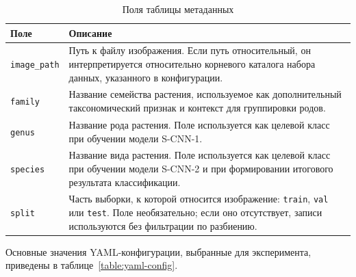 \begin{table}[!htbp]
	\centering
	\caption{Поля таблицы метаданных}
	\label{table:metadata-fields}
	\footnotesize
	\renewcommand{\arraystretch}{1.2}
	\begin{tabularx}{\linewidth}{|p{4.2cm}|X|}
		\hline
		\textbf{Поле} & \textbf{Описание} \\
		\hline
		\texttt{image\_path} & Путь к файлу изображения. Если путь относительный, он интерпретируется относительно корневого каталога набора данных, указанного в конфигурации. \\
		\hline
		\texttt{family} & Название семейства растения, используемое как дополнительный таксономический признак и контекст для группировки родов. \\
		\hline
		\texttt{genus} & Название рода растения. Поле используется как целевой класс при обучении модели S-CNN-1. \\
		\hline
		\texttt{species} & Название вида растения. Поле используется как целевой класс при обучении модели S-CNN-2 и при формировании итогового результата классификации. \\
		\hline
		\texttt{split} & Часть выборки, к которой относится изображение: \texttt{train}, \texttt{val} или \texttt{test}. Поле необязательно; если оно отсутствует, записи используются без фильтрации по разбиению. \\
		\hline
	\end{tabularx}
\end{table}
\FloatBarrier

Основные значения YAML-конфигурации, выбранные для эксперимента, приведены в таблице~\ref{table:yaml-config}.


